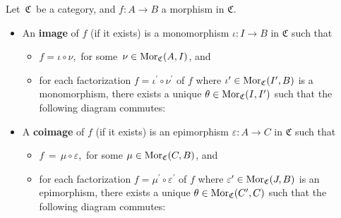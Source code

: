 \vskip 0.5cm
\begin{definition}
\mbox{}
\vskip 0.15cm
\noindent
Let \,$\mathfrak{C}$\, be a category, and $f : A \longrightarrow B$ a morphism in $\mathfrak{C}$.
\begin{itemize}
\item
	\vskip -0.1cm
	An \textbf{image} of $f$ (if it exists) is a monomorphism $\iota : I \longrightarrow B$ in $\mathfrak{C}$ such that
	\begin{itemize}
	\item
		$f = \iota \circ \nu$,\, for some \,$\nu \in \textnormal{Mor}_{\mathfrak{C}}(A,I)$, and
	\item
		for each factorization $f = \iota^{\prime} \circ \nu^{\prime}$ of $f$
		where $\iota^{\prime} \in \textnormal{Mor}_{\mathfrak{C}}(I^{\prime},B)$ is a monomorphism,
		there exists a unique $\theta \in \textnormal{Mor}_{\mathfrak{C}}(I,I^{\prime})$ such that the following diagram commutes:
		\begin{center}
		\end{center}
	\end{itemize}
\item
	A \textbf{coimage} of $f$ (if it exists) is an epimorphism $\varepsilon : A \longrightarrow C$ in $\mathfrak{C}$ such that
	\begin{itemize}
	\item
		$f \,=\, \mu \circ \varepsilon$,\, for some $\mu \in \textnormal{Mor}_{\mathfrak{C}}(C,B)$, and
	\item
		for each factorization $f = \mu^{\prime} \circ \varepsilon^{\prime}$ of $f$
		where $\varepsilon^{\prime} \in \textnormal{Mor}_{\mathfrak{C}}(J,B)$ is an epimorphism,
		there exists a unique $\theta \in \textnormal{Mor}_{\mathfrak{C}}(C^{\prime},C)$ such that the following diagram commutes:
		\begin{center}
\end{center}
\end{itemize}
\end{itemize}
\end{definition}
